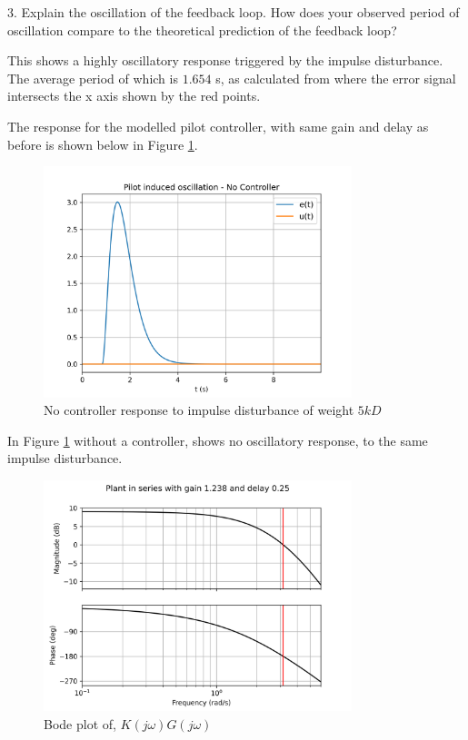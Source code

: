\documentclass[8pt]{article}
\begin{document}
3. Explain the oscillation of the feedback loop. How does your observed period of oscillation compare to the theoretical prediction of the feedback loop?

This shows a highly oscillatory response triggered by the impulse disturbance.
The average period of which is $1.654$ s, as calculated from where the error signal intersects the x axis shown by the red points.

The response for the modelled pilot controller, with same gain and delay as before is shown below in Figure \ref{fig:figure5}.

\begin{figure}[H]
    \centering
    \includegraphics[width=0.8\textwidth]{figures/FIGURE_5.png}
    \caption{No controller response to impulse disturbance of weight $5kD$ }
    \label{fig:figure5}
\end{figure}

In Figure \ref{fig:figure5} without a controller, shows no oscillatory response, to the same impulse disturbance.

\begin{figure}[H]
    \centering
    \includegraphics[width=0.8\textwidth]{figures/FIGURE_6.png}
    \caption{Bode plot of, $K(j\omega)G(j\omega)$}
    \label{fig:figure6}
\end{figure}
\end{document}
